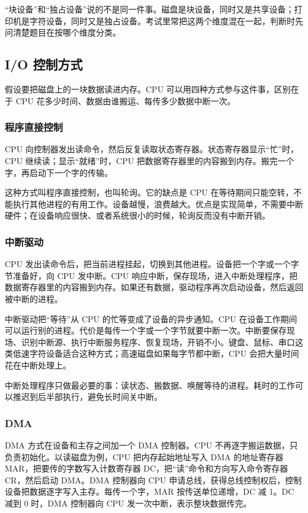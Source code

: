 “块设备”和“独占设备”说的不是同一件事。磁盘是块设备，同时又是共享设备；打印机是字符设备，同时又是独占设备。考试里常把这两个维度混在一起，判断时先问清楚题目在按哪个维度分类。

\subsection{I/O 控制方式}

假设要把磁盘上的一块数据读进内存。CPU 可以用四种方式参与这件事，区别在于 CPU 花多少时间、数据由谁搬运、每传多少数据中断一次。

\subsubsection{程序直接控制}

CPU 向控制器发出读命令，然后反复读取状态寄存器。状态寄存器显示“忙”时，CPU 继续读；显示“就绪”时，CPU 把数据寄存器里的内容搬到内存。搬完一个字，再启动下一个字的传输。

这种方式叫程序直接控制，也叫轮询。它的缺点是 CPU 在等待期间只能空转，不能执行其他进程的有用工作。设备越慢，浪费越大。优点是实现简单，不需要中断硬件；在设备响应很快、或者系统很小的时候，轮询反而没有中断开销。

\subsubsection{中断驱动}

CPU 发出读命令后，把当前进程挂起，切换到其他进程。设备把一个字或一个字节准备好，向 CPU 发中断。CPU 响应中断，保存现场，进入中断处理程序，把数据寄存器里的内容搬到内存。如果还有数据，驱动程序再次启动设备，然后返回被中断的进程。

中断驱动把“等待”从 CPU 的忙等变成了设备的异步通知。CPU 在设备工作期间可以运行别的进程。代价是每传一个字或一个字节就要中断一次。中断要保存现场、识别中断源、执行中断服务程序、恢复现场，开销不小。键盘、鼠标、串口这类低速字符设备适合这种方式；高速磁盘如果每字节都中断，CPU 会把大量时间花在中断处理上。

中断处理程序只做最必要的事：读状态、搬数据、唤醒等待的进程。耗时的工作可以推迟到后半部执行，避免长时间关中断。

\subsubsection{DMA}

DMA 方式在设备和主存之间加一个 DMA 控制器。CPU 不再逐字搬运数据，只负责初始化。以读磁盘为例，CPU 把内存起始地址写入 DMA 的地址寄存器 MAR，把要传的字数写入计数寄存器 DC，把“读”命令和方向写入命令寄存器 CR，然后启动 DMA。DMA 控制器向 CPU 申请总线，获得总线控制权后，控制设备把数据逐字写入主存。每传一个字，MAR 按传送单位递增，DC 减 1。DC 减到 0 时，DMA 控制器向 CPU 发一次中断，表示整块数据传完。

